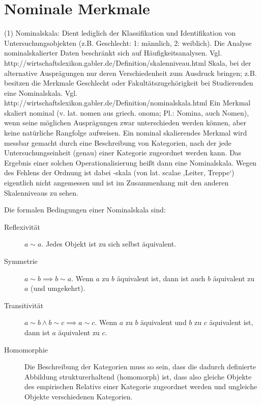 \section{Nominale Merkmale}

\todo[Umformulieren]
(1) Nominalskala: Dient lediglich der Klassifikation und Identifikation von Untersuchungsobjekten (z.B. Geschlecht: 1: männlich, 2: weiblich). 
Die Analyse nominalskalierter Daten beschränkt sich auf Häufigkeitsanalysen. Vgl. http://wirtschaftslexikon.gabler.de/Definition/skalenniveau.html
\todo[Umformulieren]
Skala, bei der alternative Ausprägungen nur deren Verschiedenheit zum Ausdruck bringen; 
z.B. besitzen die Merkmale Geschlecht oder Fakultätszugehörigkeit bei Studierenden eine Nominalskala.
Vgl. http://wirtschaftslexikon.gabler.de/Definition/nominalskala.html
\todo[Umformulieren]
Ein Merkmal skaliert nominal (v. lat. nomen  aus griech. onoma; Pl.: Nomina, auch Nomen), 
wenn seine möglichen Ausprägungen zwar unterschieden werden können, aber keine natürliche Rangfolge aufweisen.
\todo[Umformulieren]
Ein nominal skalierendes Merkmal wird messbar gemacht durch eine Beschreibung von Kategorien,
nach der jede Untersuchungseinheit (genau) einer Kategorie zugeordnet werden kann. 
Das Ergebnis einer solchen Operationalisierung heißt dann eine Nominalskala. 
Wegen des Fehlens der Ordnung ist dabei -skala (von lat. scalae ‚Leiter, Treppe‘) eigentlich nicht angemessen und 
ist im Zusammenhang mit den anderen Skalenniveaus zu sehen.


Die formalen Bedingungen einer Nominalskala sind:
\begin{description}
\item[Reflexivität] $a \sim a$. Jedes Objekt ist zu sich selbst äquivalent.
\item[Symmetrie] $a \sim b \implies b \sim a$. Wenn $a$ zu $b$ äquivalent ist, dann ist auch $b$ äquivalent zu $a$ (und umgekehrt).
\item[Transitivität] $a \sim b \land b \sim c \implies a \sim c$. Wenn $a$ zu $b$ äquivalent und $b$ zu $c$ äquivalent ist, dann ist $a$ äquivalent zu $c$.
\item[Homomorphie] \todo[Umformulieren] Die Beschreibung der Kategorien muss so sein, dass die dadurch definierte Abbildung strukturerhaltend (homomorph) ist, dass also gleiche Objekte des empirischen Relativs einer Kategorie zugeordnet werden und ungleiche Objekte verschiedenen Kategorien.
\end{description}









